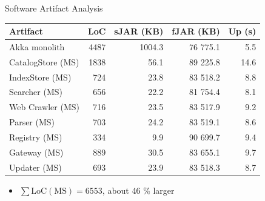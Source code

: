 \documentclass{beamer}
\begin{document}
\begin{frame}{Software Artifact Analysis}

\begin{table}
  \begin{tabular}{l|r|r|r|r}
    \textbf{Artifact} & \textbf{LoC} & \textbf{sJAR (KB)} & \textbf{fJAR (KB)} & \textbf{Up (s)}  \\ \hline
    Akka monolith     & 4487         & 1004.3             & 76 775.1           & 5.5              \\ \hline
    CatalogStore (MS) & 1838         & 56.1               & 89 225.8           & 14.6             \\ \hline
    IndexStore (MS)   & 724          & 23.8               & 83 518.2           & 8.8              \\ \hline
    Searcher (MS)     & 656          & 22.2               & 81 754.4           & 8.1              \\ \hline
    Web Crawler (MS)  & 716          & 23.5               & 83 517.9           & 9.2              \\ \hline
    Parser (MS)       & 703          & 24.2               & 83 519.1           & 8.6              \\ \hline
    Registry (MS)     & 334          & 9.9                & 90 699.7           & 9.4              \\ \hline
    Gateway (MS)      & 889          & 30.5               & 83 655.1           & 9.7              \\ \hline
    Updater (MS)      & 693          & 23.9               & 83 518.3           & 8.7              \\ \hline
  \end{tabular}
\end{table}

\begin{itemize}
  \item $\sum\mbox{LoC}(\mbox{MS}) = 6553$, about 46 \% larger
\end{itemize}

\end{frame}

\end{document}

